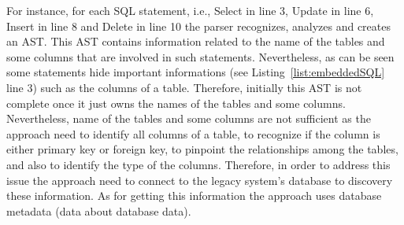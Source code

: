 \documentclass[a4paper,twoside]{article}
\begin{document}
For instance, for each SQL statement, i.e., Select in line 3, Update in line 6, Insert in line 8 and Delete in line 10 the parser recognizes, analyzes and creates an AST. This AST contains information related to the name of the tables and some columns that are involved in such statements. Nevertheless, as can be seen some statements hide important informations (see Listing~\ref{list:embeddedSQL} line 3) such as the columns of a table. Therefore, initially this AST is not complete once it just owns the names of the tables and some columns. Nevertheless, name of the tables and some columns are not sufficient as the approach need to identify all columns of a table, to recognize if the column is either primary key or foreign key, to pinpoint the relationships among the tables, and also to identify the type of the columns. Therefore, in order to address this issue the approach need to connect to the legacy system's database to discovery these information. As for getting this information the approach uses database metadata (data about database data). %











\end{document}
